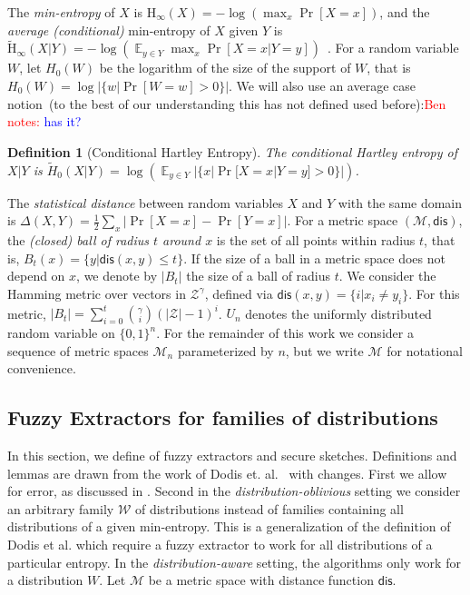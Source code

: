 \documentclass[11pt]{article}
\DeclareMathOperator*{\expe}{\mathbb{E}}
\newcommand{\dis}{\ensuremath{\mathsf{dis}}}
\newcommand{\Hoo}{\mathrm{H}_\infty}
\newcommand{\Hav}{\tilde{\mathrm{H}}_\infty}
\newtheorem{definition}[theorem]{Definition}
\newcommand{\authnote}[2]{{\textcolor{red}{\textsf{#1 notes: }\textcolor{blue}{ #2}}\marginpar{\textcolor{red}{\textbf{!!!!!}}}}}
\newcommand{\authnote}[2]{}
\newcommand{\bnote}[1]{{\authnote{Ben}{#1}}}
\begin{document}
The {\em min-entropy} of $X$ is $\Hoo(X) = -\log(\max_x \Pr[X=x])$,
and the {\em average (conditional)} min-entropy of $X$ given $Y$ is  $\Hav(X|Y) = -\log(\expe_{y\in Y} \max_{x} \Pr[X=x|Y=y])$~\cite[Section 2.4]{DBLP:journals/siamcomp/DodisORS08}.   For a random variable $W$, let $H_0(W)$ be the logarithm of the size of the support of $W$,  that is $H_0(W) = \log |\{w | \Pr[W=w]>0\}|$.  We will also use an average case notion~(to the best of our understanding this has not defined used before):\bnote{has it?}
\begin{definition}[Conditional Hartley Entropy]
\label{def:conditional hartley}
The conditional Hartley entropy of $X |Y $ is $\tilde{H}_0(X |Y) = \log ( \expe_{y\in Y} |\{x | \Pr[X=x |Y=y]>0\}|)$.
\end{definition}
The {\em statistical distance} between random variables $X$ and $Y$ with the same domain is $\Delta(X,Y) = \frac12 \sum_x |\Pr[X=x] - \Pr[Y=x]|$.
For a metric space $(\mathcal{M}, \dis)$, the \emph{(closed) ball of radius $t$ around $x$} is the set of all points within radius $t$, that is, $B_t(x) = \{y| \dis(x, y)\leq t\}$.  If the size of a ball in a metric space does not depend on $x$, we denote by $|B_t|$ the size of a ball of radius $t$.  We consider the Hamming metric over vectors in $\mathcal{Z}^\gamma$, defined via $\dis(x,y) = \{i | x_i \neq y_i\}$.  For this metric, $|B_t| = \sum_{i=0}^t {\gamma \choose i} (|\mathcal{Z}|-1)^i $.  $U_n$ denotes the uniformly  distributed random variable on $\{0,1\}^n$.  For the remainder of this work we consider a sequence of metric spaces $\mathcal{M}_n$ parameterized by $n$, but we write $\mathcal{M}$ for notational convenience.

\subsection{Fuzzy Extractors for families of distributions}\label{sec:fuzz extractor}

In this section, we define of fuzzy extractors and secure sketches.  Definitions and lemmas are drawn from the work of Dodis et. al.~\cite[Sections 2.5--4.1]{DBLP:journals/siamcomp/DodisORS08} with changes.  First we allow for error, as discussed in \cite[Sections 8]{DBLP:journals/siamcomp/DodisORS08}.  Second in the \emph{distribution-oblivious} setting we consider an arbitrary family $\mathcal{W}$ of distributions instead of families containing all distributions of a given min-entropy.  This is a generalization of the definition of Dodis et al. which require a fuzzy extractor to work for all distributions of a particular entropy.  In the \emph{distribution-aware} setting, the algorithms only work for a distribution $W$.  Let $\mathcal{M}$ be a metric space with distance function $\dis$.
\end{document}

